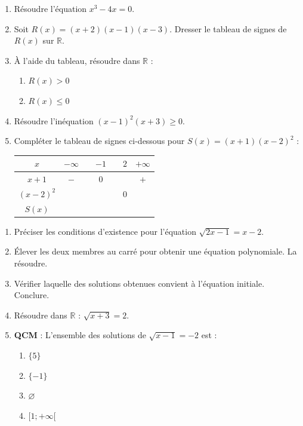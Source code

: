 \documentclass[11pt]{article}
\begin{document}
\begin{exercice}
\begin{enumerate}
    \item Résoudre l'équation $x^3 - 4x = 0$.
    \item Soit $R(x) = (x+2)(x-1)(x-3)$. Dresser le tableau de signes de $R(x)$ sur $\mathbb{R}$.
    \item À l'aide du tableau, résoudre dans $\mathbb{R}$ :
    \begin{enumerate}
        \item $R(x) > 0$
        \item $R(x) \leqslant 0$
    \end{enumerate}
    \item Résoudre l'inéquation $(x-1)^2(x+3) \geqslant 0$.
    \item Compléter le tableau de signes ci-dessous pour $S(x) = (x+1)(x-2)^2$ :
    \begin{center}
\begin{tabular}{|c|ccccc|c|}
\hline
$x$ & $-\infty$ & & $-1$ & & $2$ & $+\infty$ \\
\hline
$x+1$ & $-$ & & $0$ & & & $+$ \\
$(x-2)^2$ & & & & & $0$ & \\
\hline
$S(x)$ & & & & & & \\
\hline
\end{tabular}
    \end{center}
\end{enumerate}
\end{exercice}

\begin{exercice}
\begin{enumerate}
    \item Préciser les conditions d'existence pour l'équation $\sqrt{2x - 1} = x - 2$.
    \item Élever les deux membres au carré pour obtenir une équation polynomiale. La résoudre.
    \item Vérifier laquelle des solutions obtenues convient à l'équation initiale. Conclure.
    \item Résoudre dans $\mathbb{R}$ : $\sqrt{x + 3} = 2$.
    \item \textbf{QCM} : L'ensemble des solutions de $\sqrt{x-1} = -2$ est :
    \begin{enumerate}
        \item $\{5\}$
        \item $\{-1\}$
        \item $\varnothing$
        \item $[1; +\infty[$
    \end{enumerate}
\end{enumerate}
\end{exercice}
\end{document}
